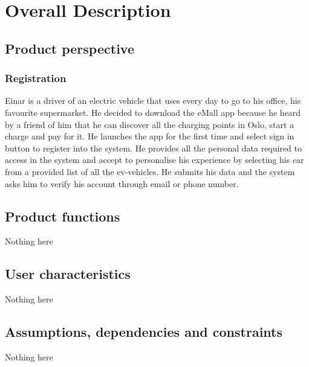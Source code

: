 \section{Overall Description}

\subsection{Product perspective}

\subsubsection{Registration}
Einar is a driver of an electric vehicle that uses every day to go to his office, his favourite supermarket. He decided to download the eMall app because he heard by a friend of him that he can discover all the charging points in Oslo, start a charge and pay for it. He launches the app for the first time and select sign in button to register into the system. He provides all the personal data required to access in the system and accept to personalise his experience by selecting his car from a provided list of all the ev-vehicles. He submits his data and the system asks him to verify his account through email or phone number.

\subsection{Product functions}
Nothing here

\subsection{User characteristics}
Nothing here

\subsection{Assumptions, dependencies and constraints}
Nothing here
